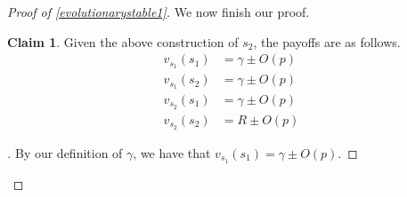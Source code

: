 \documentclass[11pt]{amsart}
\theoremstyle{definition}
\newtheorem{claim}[theorem]{Claim}
\theoremstyle{remark}
\newenvironment{subproof}[1][\proofname]{%
  \renewcommand{\qedsymbol}{$\blacksquare$}%
  \begin{proof}[#1]%
}{%
  \end{proof}%
}
\begin{document}
\begin{proof}[Proof of \cref{evolutionarystable1}]
      We now finish our proof.

      \begin{claim}
        \label{claimpayoffs}
        Given the above construction of $s_2$, the payoffs are as follows.
      \begin{align*}
        v_{s_1}(s_1) &= \gamma \pm O(p) \\
        v_{s_1}(s_2) &= \gamma \pm O(p) \\
        v_{s_2}(s_1) &= \gamma \pm O(p) \\
        v_{s_2}(s_2) &= R \pm O(p)
      \end{align*}
      \end{claim}
      \begin{subproof}

        By our definition of $\gamma$, we have that $v_{s_1}(s_1) = \gamma \pm O(p)$.


\end{subproof}
\end{proof}
\end{document}
